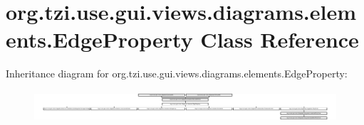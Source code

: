 \hypertarget{classorg_1_1tzi_1_1use_1_1gui_1_1views_1_1diagrams_1_1elements_1_1_edge_property}{\section{org.\-tzi.\-use.\-gui.\-views.\-diagrams.\-elements.\-Edge\-Property Class Reference}
\label{classorg_1_1tzi_1_1use_1_1gui_1_1views_1_1diagrams_1_1elements_1_1_edge_property}
}
Inheritance diagram for org.\-tzi.\-use.\-gui.\-views.\-diagrams.\-elements.\-Edge\-Property\-:\begin{figure}[H]
\begin{center}
\leavevmode
\includegraphics[height=1.183932cm]{classorg_1_1tzi_1_1use_1_1gui_1_1views_1_1diagrams_1_1elements_1_1_edge_property}
\end{center}
\end{figure}
